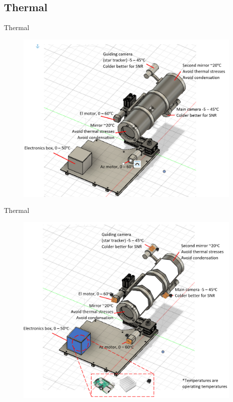 \documentclass[11pt, aspectratio=169]{beamer}
\begin{document}

\subsection{Thermal}
\begin{frame}[c]{Thermal}
    \begin{figure}
        \includegraphics[height=1\textheight]{images/thermalsystem.png}
    \end{figure}
\end{frame}

\begin{frame}[c]{Thermal}
    \begin{figure}[h!]
        \centering
        \includegraphics[height=1\textheight]{images/thermalsystem2.png}
    \end{figure}
\end{frame}
\end{document}
